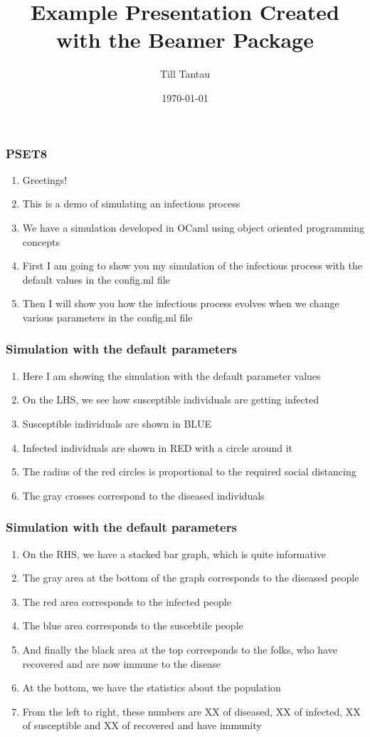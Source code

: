 \documentclass{beamer}
\title{Example Presentation Created with the Beamer Package}
\author{Till Tantau}
\date{\today}
\begin{document}
\frame
{
  \frametitle{PSET8}

\begin{enumerate}
\item Greetings!
\item This is a demo of simulating an infectious process
\item We have a simulation developed in OCaml using object oriented programming concepts
\item First I am going to show you my simulation of the infectious process with the default values in the config.ml file
\item Then I will show you how the infectious process evolves when we change various parameters in the config.ml file
\end{enumerate}
 }
 
 
 \frame
{
  \frametitle{Simulation with the default parameters}

\begin{enumerate}
\item Here I am showing the simulation with the default parameter values
\item On the LHS, we see how susceptible individuals are getting infected
\item Susceptible individuals are shown in BLUE
\item Infected individuals are shown in RED with a circle around it
\item The radius of the red circles is proportional to the required social distancing
\item The gray crosses correspond to the diseased individuals
\end{enumerate}
 }
 
  
 \frame
{
  \frametitle{Simulation with the default parameters}

\begin{enumerate}
\item On the RHS, we have a stacked bar graph, which is quite informative
\item The gray area at the bottom of the graph corresponds to the diseased people
\item The red area corresponds to the infected people
\item The blue area corresponds to the suscebtile people
\item And finally the black area at the top corresponds to the folks, who have recovered and are now immune to the disease
\item At the bottom, we have the statistics about the population
\item From the left to right, these numbers are XX of diseased, XX of infected, XX of susceptible and XX of recovered and have immunity
\end{enumerate}
 }
 
\end{document}

